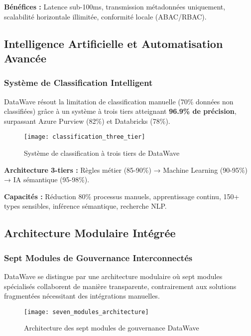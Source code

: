 \textbf{Bénéfices :} Latence sub-100ms, transmission métadonnées uniquement, scalabilité horizontale illimitée, conformité locale (ABAC/RBAC).

\subsection{Intelligence Artificielle et Automatisation Avancée}

\subsubsection{Système de Classification Intelligent}

DataWave résout la limitation de classification manuelle (70\% données non classifiées) grâce à un système à trois tiers atteignant \textbf{96.9\% de précision}, surpassant Azure Purview (82\%) et Databricks (78\%).

\begin{figure}[htpb]
\centering
\texttt{[image: classification\_three\_tier]}
\caption{Système de classification à trois tiers de DataWave}
\label{fig:classification_system}
\end{figure}

\textbf{Architecture 3-tiers :} Règles métier (85-90\%) → Machine Learning (90-95\%) → IA sémantique (95-98\%).

\textbf{Capacités :} Réduction 80\% processus manuels, apprentissage continu, 150+ types sensibles, inférence sémantique, recherche NLP.

\subsection{Architecture Modulaire Intégrée}

\subsubsection{Sept Modules de Gouvernance Interconnectés}

DataWave se distingue par une architecture modulaire où sept modules spécialisés collaborent de manière transparente, contrairement aux solutions fragmentées nécessitant des intégrations manuelles.

\begin{figure}[htpb]
\centering
\texttt{[image: seven\_modules\_architecture]}
\caption{Architecture des sept modules de gouvernance DataWave}
\label{fig:seven_modules}
\end{figure}

